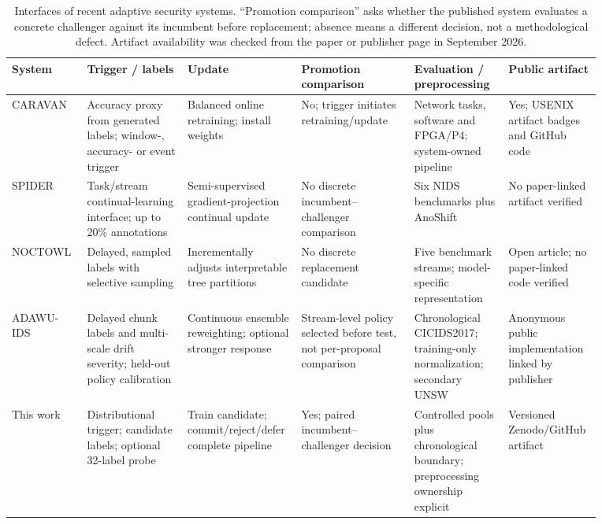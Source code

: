 \documentclass[a4paper,11pt]{article}
\begin{document}
\clearpage
\begin{landscape}
\begin{table}[p]
\centering
\caption{Interfaces of recent adaptive security systems. ``Promotion comparison'' asks
whether the published system evaluates a concrete challenger against its incumbent before
replacement; absence means a different decision, not a methodological defect. Artifact
availability was checked from the paper or publisher page in September 2026.}
\label{tab:adaptive_interface}
\scriptsize
\setlength{\tabcolsep}{3pt}
\begin{tabular}{p{0.12\linewidth} p{0.16\linewidth} p{0.14\linewidth} p{0.18\linewidth} p{0.15\linewidth} p{0.12\linewidth}}
\toprule
System & Trigger / labels & Update & Promotion comparison & Evaluation / preprocessing & Public artifact \\
\midrule
CARAVAN \cite{zhang2024caravan} & Accuracy proxy from generated labels; window-, accuracy- or event trigger & Balanced online retraining; install weights & No; trigger initiates retraining/update & Network tasks, software and FPGA/P4; system-owned pipeline & Yes; USENIX artifact badges and GitHub code \\
SPIDER \cite{amalapuram2024spider} & Task/stream continual-learning interface; up to 20\% annotations & Semi-supervised gradient-projection continual update & No discrete incumbent--challenger comparison & Six NIDS benchmarks plus AnoShift & No paper-linked artifact verified \\
NOCTOWL \cite{pederzoli2025noctowl} & Delayed, sampled labels with selective sampling & Incrementally adjusts interpretable tree partitions & No discrete replacement candidate & Five benchmark streams; model-specific representation & Open article; no paper-linked code verified \\
ADAWU-IDS \cite{yuan2026adawu} & Delayed chunk labels and multi-scale drift severity; held-out policy calibration & Continuous ensemble reweighting; optional stronger response & Stream-level policy selected before test, not per-proposal comparison & Chronological CICIDS2017; training-only normalization; secondary UNSW & Anonymous public implementation linked by publisher \\
This work & Distributional trigger; candidate labels; optional 32-label probe & Train candidate; commit/reject/defer complete pipeline & Yes; paired incumbent--challenger decision & Controlled pools plus chronological boundary; preprocessing ownership explicit & Versioned Zenodo/GitHub artifact \\
\bottomrule
\end{tabular}
\end{table}
\end{landscape}



\end{document}
